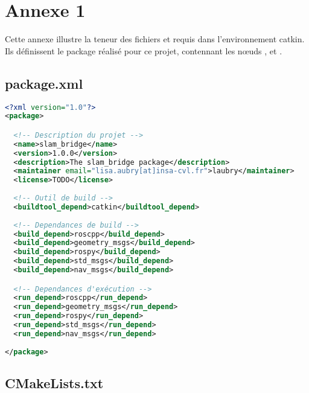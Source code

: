 \chapter*{Annexe 1}

\makeatletter
\renewcommand{\thesection}{\@arabic\c@section}
\makeatother

\setcounter{section}{0}

Cette annexe illustre la teneur des fichiers  et  requis dans l'environnement catkin.
Ils définissent le package  réalisé pour ce projet, contennant les n\oe{}uds ,  et . 

\section{package.xml}

\begin{lstlisting}[language=xml]
<?xml version="1.0"?>
<package>

  <!-- Description du projet --> 
  <name>slam_bridge</name>
  <version>1.0.0</version>
  <description>The slam_bridge package</description>
  <maintainer email="lisa.aubry[at]insa-cvl.fr">laubry</maintainer>
  <license>TODO</license>
  
  <!-- Outil de build --> 
  <buildtool_depend>catkin</buildtool_depend>
  
  <!-- Dependances de build --> 
  <build_depend>roscpp</build_depend>
  <build_depend>geometry_msgs</build_depend>
  <build_depend>rospy</build_depend>
  <build_depend>std_msgs</build_depend>
  <build_depend>nav_msgs</build_depend>

  <!-- Dependances d'exécution -->
  <run_depend>roscpp</run_depend>
  <run_depend>geometry_msgs</run_depend>
  <run_depend>rospy</run_depend>
  <run_depend>std_msgs</run_depend>
  <run_depend>nav_msgs</run_depend>
  
</package>
\end{lstlisting}


\section{CMakeLists.txt}

